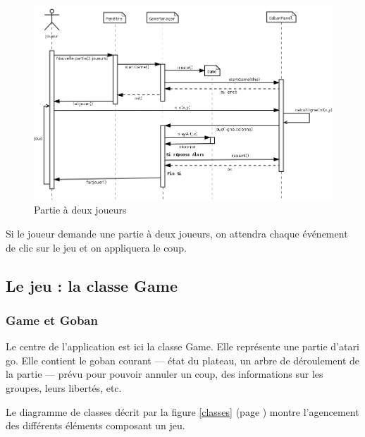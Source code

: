 \documentclass[11pt,a4paper,titlepage,french]{article}
\begin{document}
				\begin{figure}[ohbt]
					\begin{center}
						\includegraphics[width=1.1\textwidth]{./IA_2J.png}
					\end{center}
					\caption{Partie à deux joueurs}
					\label{twoplayers}
				\end{figure}

				Si le joueur demande une partie à deux joueurs, on attendra chaque événement de clic sur le jeu et on appliquera le coup.

		\subsection{Le jeu : la classe Game}\label{howgame}


			\subsubsection{Game et Goban}

			Le centre de l'application est ici la classe Game. Elle représente une partie d'atari go. Elle contient le goban courant --- état du plateau, un arbre de déroulement de la partie --- prévu pour pouvoir annuler un coup, des informations sur les groupes, leurs libertés, etc.

			Le diagramme de classes décrit par la figure \ref{classes} (page \pageref{classes}) montre l'agencement des différents éléments composant un jeu.
\end{document}

